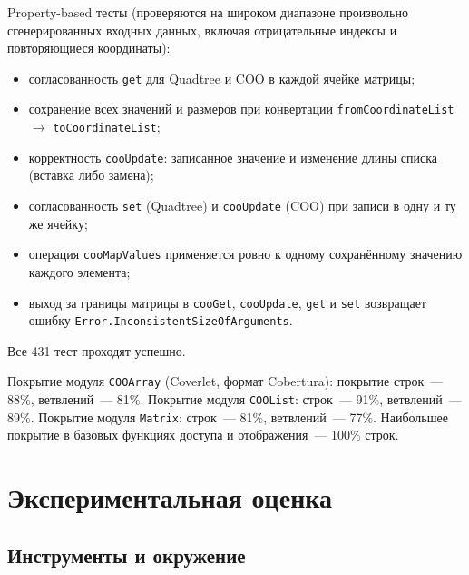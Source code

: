 \documentclass[a4paper]{article}
\begin{document}
Property-based тесты (проверяются на широком диапазоне произвольно сгенерированных входных данных, включая отрицательные индексы и повторяющиеся координаты):
\begin{itemize}
    \item согласованность \texttt{get} для Quadtree и COO в каждой ячейке матрицы;
    \item сохранение всех значений и размеров при конвертации \texttt{fromCoordinateList} $\rightarrow$ \texttt{toCoordinateList};
    \item корректность \texttt{cooUpdate}: записанное значение и изменение длины списка (вставка либо замена);
    \item согласованность \texttt{set} (Quadtree) и \texttt{cooUpdate} (COO) при записи в одну и ту же ячейку;
    \item операция \texttt{cooMapValues} применяется ровно к одному сохранённому значению каждого элемента;
    \item выход за границы матрицы в \texttt{cooGet}, \texttt{cooUpdate}, \texttt{get} и \texttt{set} возвращает ошибку \texttt{Error.InconsistentSizeOfArguments}.
\end{itemize}

Все 431 тест проходят успешно.

Покрытие модуля \texttt{COOArray} (Coverlet, формат Cobertura): покрытие строк~--- 88\%, ветвлений~--- 81\%. Покрытие модуля \texttt{COOList}: строк~--- 91\%, ветвлений~--- 89\%. Покрытие модуля \texttt{Matrix}: строк~--- 81\%, ветвлений~--- 77\%. Наибольшее покрытие в базовых функциях доступа и отображения~--- 100\% строк.

\section{Экспериментальная оценка}
\label{sec:exp}

\subsection{Инструменты и окружение}
\end{document}
